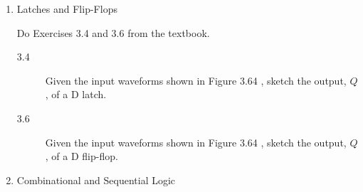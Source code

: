 \documentclass{ps}
\begin{document}
\begin{enumerate}
\begin{center}
  \end{center}
  \begin{solution}
  \end{solution}

\item Latches and Flip-Flops

  Do Exercises 3.4 and 3.6 from the textbook.
  \newcommand{\waveform}[1]{
    foreach \x/\y in {#1} {
      -- ++(\x,0) -- ++(.25,\y)
    }
  }
  \newcommand{\inputwaveforms}{
    \draw
    (0,0) node[above]{CLK}
    \waveform{
      1.25/1,
      1/-1,
      1.75/1,
      .625/-1,
      1.75/1,
      .875/-1,
      .5/1,
      2/-1,
      1.25/1
    }
    -- +(1.25,0)

    (0,-1.5) node[above]{D}
    \waveform{
      1.875/1,
      1/-1,
      .5/1,
      .875/-1,
      .875/1,
      1.375/-1,
      1.75/1,
      .375/-1,
      .375/1,
      2.125/-1
    }
    -- +(.875,0);
  }
  \begin{description}
  \item[3.4] Given the input waveforms shown in Figure 3.64 \figurebelow, sketch
    the output, \(Q\), of a D latch.
    \begin{center}
    \end{center}
    \begin{solution}
    \end{solution}

  \item[3.6] Given the input waveforms shown in Figure 3.64
    \figurebelow, sketch the output, \(Q\), of a D flip-flop.
    \begin{center}
    \end{center}
    \begin{solution}
    \end{solution}
  \end{description}

\item Combinational and Sequential Logic


\end{enumerate}
\end{document}
